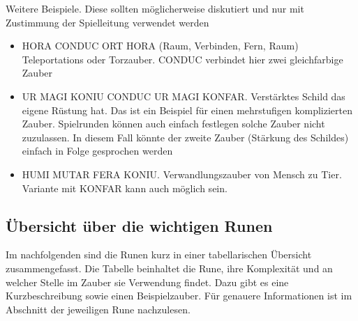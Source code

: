 \documentclass{article}
\begin{document}
Weitere Beispiele. Diese sollten möglicherweise diskutiert und nur mit Zustimmung der Spielleitung verwendet werden

\begin{itemize}
\item HORA CONDUC ORT HORA (Raum, Verbinden, Fern, Raum) Teleportations oder Torzauber. CONDUC verbindet hier zwei gleichfarbige Zauber
\item UR MAGI KONIU CONDUC UR MAGI KONFAR. Verstärktes Schild das eigene Rüstung hat. Das ist ein Beispiel für einen mehrstufigen komplizierten Zauber. Spielrunden können auch einfach festlegen solche Zauber nicht zuzulassen. In diesem Fall könnte der zweite Zauber (Stärkung des Schildes) einfach in Folge gesprochen werden
\item HUMI MUTAR FERA KONIU. Verwandlungszauber von Mensch zu Tier. Variante mit KONFAR kann auch möglich sein.
\end{itemize}

\begin{center}
\subsection{Übersicht über die wichtigen Runen}
\end{center}

Im nachfolgenden sind die Runen kurz in einer tabellarischen Übersicht zusammengefasst. Die Tabelle beinhaltet
die Rune, ihre Komplexität und an welcher Stelle im Zauber sie Verwendung findet. Dazu gibt es eine Kurzbeschreibung
sowie einen Beispielzauber. Für genauere Informationen ist im Abschnitt der jeweiligen Rune nachzulesen.
\end{document}

